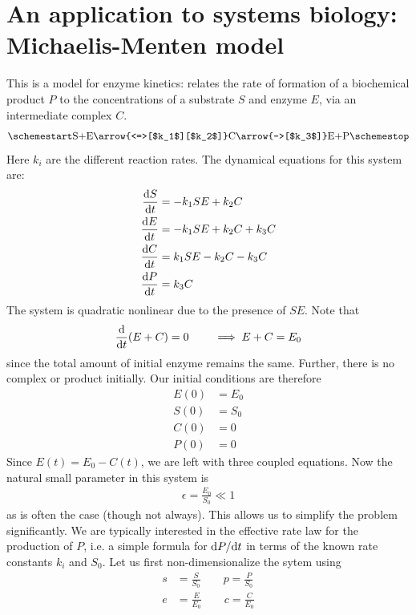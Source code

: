 \chapter[Michaelis-Menten model]{An application to systems biology: Michaelis-Menten model}

This is a model for enzyme kinetics: relates the rate of formation of a biochemical product $P$ to the concentrations of a substrate $S$ and enzyme $E$, via an intermediate complex $C$. 
\begin{gather*}
	\schemestart
	$S$ + $E$ \arrow{<=>[$k_1$][$k_2$]} $C$
	\arrow{->[$k_3$]} $E$ + $P$  
	\schemestop
\end{gather*}
Here $k_i$ are the different reaction rates. The dynamical equations for this system are:
\begin{align*}
	\frac{\mathrm{d} S}{\mathrm{d} t} &= -k_1 SE + k_2 C\\
	\frac{\mathrm{d} E}{\mathrm{d} t} &= -k_1 SE + k_2 C + k_3 C \\
	\frac{\mathrm{d} C}{\mathrm{d} t} &= k_1 SE - k_2 C - k_3 C \\
	\frac{\mathrm{d} P}{\mathrm{d} t} &= k_3 C
\end{align*}
The system is quadratic nonlinear due to the presence of $SE$. Note that
\begin{gather*}
	\frac{\mathrm{d}}{\mathrm{d} t} (E+C) = 0 \qquad \implies E + C = E_0
\end{gather*}
since the total amount of initial enzyme remains the same. Further, there is no complex or product initially. Our initial conditions are therefore
\begin{align*}
	E(0) &= E_0 \\
	S(0) &= S_0 \\
	C(0) &= 0 \\
	P(0) &= 0
\end{align*}  
Since $E(t) = E_0 - C(t)$, we are left with three coupled equations. Now the natural small parameter in this system is 
\begin{gather*}
	\epsilon = \frac{E_0}{S_0} \ll 1
\end{gather*}
as is often the case (though not always). This allows us to simplify the problem significantly. We are typically interested in the effective rate law for the production of $P$, i.e. a simple formula for $\mathrm{d} P/\mathrm{d} t$ in terms of the known rate constants $k_i$ and $S_0$. Let us first non-dimensionalize the sytem using
\begin{align*}
	s &= \frac{S}{S_0} \qquad p = \frac{P}{S_0} \\
	e &= \frac{E}{E_0} \qquad c = \frac{C}{E_0} 
\end{align*}
